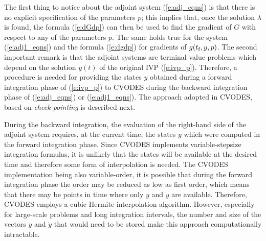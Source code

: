 The first thing to notice about the adjoint system (\ref{e:adj_eqns}) is that there is 
no explicit specification of the parameters $p$; this implies that, once the solution
$\lambda$ is found, the formula (\ref{e:dGdp}) can then be used to find the gradient
of $G$ with respect to any of the parameters $p$. The same holds true for the system
(\ref{e:adj1_eqns}) and the formula (\ref{e:dgdp}) for gradients of $g(t_\mb{f},y,p)$. 
The second important remark is that the adjoint systems are terminal value problems 
which depend on the solution $y(t)$ of the original IVP (\ref{e:ivp_p}). 
Therefore, a procedure is needed for providing the states $y$ obtained during a forward 
integration phase of (\ref{e:ivp_p}) to CVODES during the backward integration phase 
of (\ref{e:adj_eqns}) or (\ref{e:adj1_eqns}). 
The approach adopted in CVODES, based on {\em check-pointing} is described next.

During the backward integration, the evaluation of the right-hand side 
of the adjoint system requires, at the current time, the states $y$ which
were computed in the forward integration phase.
Since CVODES implements variable-stepsize integration formulas,
it is unlikely that the states will be available at the desired time and
therefore some form of interpolation is needed. The CVODES implementation
being also variable-order, it is possible that during the forward
integration phase the order may be reduced as low as first order,
which means that there may be points in time where only $y$ and ${\dot y}$
are available. Therefore, CVODES employs a cubic Hermite interpolation
algorithm. However, especially for large-scale problems and long integration
intervals, the number and size of the vectors $y$ and ${\dot y}$ that would 
need to be stored make this approach computationally intractable. 

